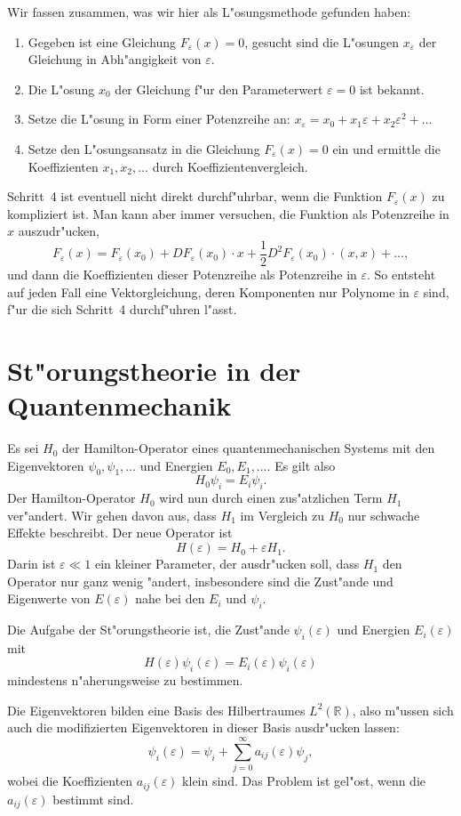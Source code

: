 Wir fassen zusammen, was wir hier als L"osungsmethode gefunden haben:
\begin{enumerate}
\item Gegeben ist eine Gleichung $F_\varepsilon(x)=0$, gesucht
sind die L"osungen $x_\varepsilon$ der Gleichung in Abh"angigkeit von
$\varepsilon$.
\item Die L"osung $x_0$ der Gleichung f"ur den Parameterwert $\varepsilon=0$
ist bekannt.
\item Setze die L"osung in Form einer Potenzreihe an:
$x_\varepsilon = x_0+x_1\varepsilon+x_2\varepsilon^2+\dots$
\item Setze den L"osungsansatz in die Gleichung $F_\varepsilon(x)=0$ ein
und ermittle die Koeffizienten $x_1,x_2,\dots$ durch Koeffizientenvergleich.
\end{enumerate}
Schritt~4 ist eventuell nicht direkt durchf"uhrbar, wenn die Funktion
$F_\varepsilon(x)$ zu kompliziert ist. Man kann aber immer versuchen, die
Funktion als Potenzreihe in $x$ auszudr"ucken, 
\[
F_\varepsilon(x)=F_\varepsilon(x_0) + DF_\varepsilon(x_0)\cdot x
+ \frac12 D^2F_\varepsilon(x_0)\cdot(x,x)+\dots,
\]
und dann die Koeffizienten dieser Potenzreihe als Potenzreihe in $\varepsilon$.
So entsteht auf jeden Fall eine Vektorgleichung, deren Komponenten nur
Polynome in $\varepsilon$ sind, f"ur die sich Schritt~4 durchf"uhren l"asst.

\section{St"orungstheorie in der Quantenmechanik}
Es sei $H_0$ der Hamilton-Operator eines quantenmechanischen Systems
mit den Eigenvektoren $\psi_0,\psi_1,\dots$ und Energien $E_0,E_1,\dots$.
Es gilt also 
\[
H_0\psi_i = E_i\psi_i.
\]
Der Hamilton-Operator $H_0$ wird nun durch einen zus"atzlichen Term
$H_1$ ver"andert. Wir gehen davon aus, dass $H_1$ im Vergleich zu
$H_0$ nur schwache Effekte beschreibt. Der neue Operator ist
\[
H(\varepsilon)=H_0+\varepsilon H_1.
\]
Darin ist $\varepsilon\ll 1$ ein kleiner Parameter, der ausdr"ucken
soll, dass $H_1$ den Operator nur ganz wenig "andert, insbesondere
sind die Zust"ande und Eigenwerte von $E(\varepsilon)$ nahe bei 
den $E_i$ und $\psi_i$.

Die Aufgabe der St"orungstheorie ist, die Zust"ande $\psi_i(\varepsilon)$
und Energien $E_i(\varepsilon)$ mit
\[
H(\varepsilon)\psi_i(\varepsilon)=E_i(\varepsilon)\psi_i(\varepsilon)
\]
mindestens n"aherungsweise zu bestimmen.

Die Eigenvektoren bilden eine Basis des Hilbertraumes $L^2(\mathbb R)$, 
also m"ussen sich auch die modifizierten Eigenvektoren in dieser Basis
ausdr"ucken lassen:
\[
\psi_i(\varepsilon)=\psi_i +\sum_{j=0}^\infty a_{ij}(\varepsilon)\psi_j,
\]
wobei die Koeffizienten $a_{ij}(\varepsilon)$ klein sind.
Das Problem ist gel"ost, wenn die $a_{ij}(\varepsilon)$ bestimmt sind.

